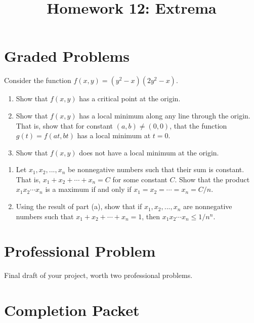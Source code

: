 \documentclass{ximera}
\title{Homework 12: Extrema}
\begin{document}
\begin{abstract}
\end{abstract}
\maketitle

\section*{Graded Problems}

\begin{problem}
 Consider the function $f(x,y) = (y^2-x)(2y^2-x)$. \begin{enumerate}
\item Show that $f(x,y)$ has a critical point at the origin.
\item Show that $f(x,y)$ has a local minimum along any line through the origin. That is, show that for constant $(a,b)\neq (0,0)$, that the function $g(t)=f(at,bt)$ has a local minimum at $t=0$.
\item Show that $f(x,y)$ does not have a local minimum at the origin.
\end{enumerate}
\end{problem}

\begin{problem}
\begin{enumerate}
\item Let $x_1,x_2,...,x_n$ be nonnegative numbers such that their sum is constant. That is, $x_1+x_2+\cdots +x_n=C$ for some constant $C$. Show that the product $x_1x_2\cdots x_n$ is a maximum if and only if $x_1=x_2=\cdots =x_n = C/n$.
\item Using the result of part (a), show that if $x_1,x_2,...,x_n$ are nonnegative numbers such that $x_1+x_2+\cdots +x_n=1$, then $x_1x_2\cdots x_n\leq 1/n^n$.
\end{enumerate}
\end{problem}

\section*{Professional Problem}

\begin{problem} Final draft of your project, worth two professional problems.
\end{problem}

\section*{Completion Packet}
\end{document}
